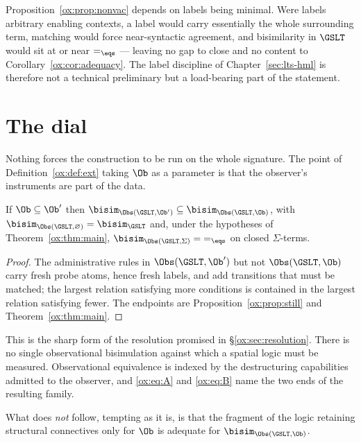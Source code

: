 \begin{remark}
\label{ox:rem:minimality}
Proposition~\ref{ox:prop:nonvac} depends on labels being minimal. Were labels
arbitrary enabling contexts, a label would carry essentially the whole surrounding
term, matching would force near-syntactic agreement, and bisimilarity in $\GSLT$
would sit at or near $=_{\eqs}$ --- leaving no gap to close and no content to
Corollary~\ref{ox:cor:adequacy}. The label discipline of
Chapter~\ref{sec:lts-hml} is therefore not a technical preliminary but a
load-bearing part of the statement.
\end{remark}

\section{The dial}
\label{ox:sec:dial}

Nothing forces the construction to be run on the whole signature. The point of
Definition~\ref{ox:def:ext} taking $\Ob$ as a parameter is that the observer's
instruments are part of the data.

\begin{proposition}[Monotonicity]
\label{ox:prop:mono}
If $\Ob \subseteq \Ob'$ then
$\bisim_{\Obs(\GSLT,\Ob')} \subseteq \bisim_{\Obs(\GSLT,\Ob)}$, with
$\bisim_{\Obs(\GSLT,\varnothing)} = \bisim_{\GSLT}$ and, under the hypotheses of
Theorem~\ref{ox:thm:main}, $\bisim_{\Obs(\GSLT,\Sigma)} = {=_{\eqs}}$ on closed
$\Sigma$-terms.
\end{proposition}

\begin{proof}
The administrative rules in $\Obs(\GSLT,\Ob')$ but not $\Obs(\GSLT,\Ob)$ carry
fresh probe atoms, hence fresh labels, and add transitions that must be matched;
the largest relation satisfying more conditions is contained in the largest
relation satisfying fewer. The endpoints are Proposition~\ref{ox:prop:still} and
Theorem~\ref{ox:thm:main}.
\end{proof}

This is the sharp form of the resolution promised in \S\ref{ox:sec:resolution}.
There is no single observational bisimulation against which a spatial logic must be
measured. Observational equivalence is indexed by the destructuring capabilities
admitted to the observer, and \eqref{ox:eq:A} and \eqref{ox:eq:B} name the two ends
of the resulting family.

What does \emph{not} follow, tempting as it is, is that the fragment of the logic
retaining structural connectives only for $\Ob$ is adequate for
$\bisim_{\Obs(\GSLT,\Ob)}$.


